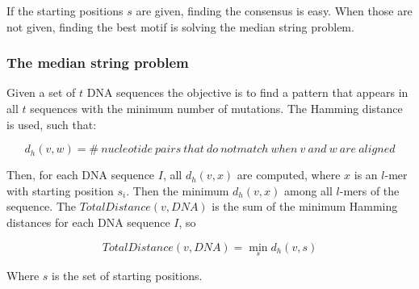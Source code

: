 		If the starting positions $s$ are given, finding the consensus is easy.
		When those are not given, finding the best motif is solving the median string problem.

		\subsubsection{The median string problem}
		Given a set of $t$ DNA sequences the objective is to find a pattern that appears in all $t$ sequences with the minimum number of mutations.
		The Hamming distance is used, such that:

		$$d_h(v, w) = \#\ nucleotide\ pairs\ that\ do\ not match\ when\ v\ and\ w\ are\ aligned$$

		Then, for each DNA sequence $I$, all $d_h(v,x)$ are computed, where $x$ is an $l$-mer with starting position $s_i$.
		Then the minimum $d_h(v,x)$ among all $l$-mers of the sequence.
		The $TotalDistance(v,DNA)$ is the sum of the minimum Hamming distances for each DNA sequence $I$, so

		$$TotalDistance(v,DNA) = \min\limits_s d_h(v,s)$$

		Where $s$ is the set of starting positions.
